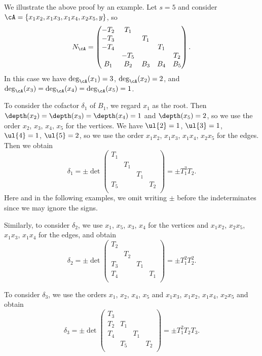 \begin{exam}
We illustrate the above proof by an example.
Let $s = 5$ and consider $\cA = \{x_1 x_2, x_1 x_3, x_1 x_4, x_2 x_5, y\}$, so
\[
N_{\cA}
= \begin{pmatrix}
	-T_2 & T_1 & & &\\
	-T_3 & & T_1 & &\\
	-T_4 & & & T_1 &\\
	& -T_5 & & & T_2\\
	B_1 & B_2 & B_3 & B_4 & B_5	
\end{pmatrix}.
\]
In this case we have $\deg_{\cA}(x_1) = 3$, $\deg_{\cA}(x_2) = 2$, and $\deg_{\cA}(x_3) = \deg_{\cA}(x_4) = \deg_{\cA}(x_5) = 1$.

To consider the cofactor $\delta_1$ of $B_1$, we regard $x_1$ as the root.
Then $\depth(x_2) = \depth(x_3) = \depth(x_4) = 1$ and $\depth(x_5) = 2$, so we use the order $x_2$, $x_3$, $x_4$, $x_5$ for the vertices.
We have $\ul{2} = 1$, $\ul{3} = 1$, $\ul{4} = 1$, $\ul{5} = 2$, so we use the order $x_1 x_2$, $x_1 x_3$, $x_1 x_4$, $x_2 x_5$ for the edges.
Then we obtain
\[
\delta_1 = \pm \det 
\begin{pmatrix}
	T_1 & & &\\
	& T_1 & &\\
	& & T_1 &\\
	T_5 & & & T_2\\
\end{pmatrix}
= \pm T_1^3 T_2.
\]
Here and in the following examples, we omit writing $\pm$ before the indeterminates since we may ignore the signs.

Similarly, to consider $\delta_2$, we use $x_1$, $x_5$, $x_3$, $x_4$ for the vertices and $x_1 x_2$, $x_2 x_5$, $x_1 x_3$, $x_1 x_4$ for the edges, and obtain
\[
\delta_2 = \pm \det 
\begin{pmatrix}
	T_2 & & &\\
	& T_2 & &\\
	T_3 & & T_1 &\\
	T_4 & & & T_1\\
\end{pmatrix}
= \pm T_1^2 T_2^2.
\]

To consider $\delta_3$, we use the orders $x_1$, $x_2$, $x_4$, $x_5$ and $x_1 x_3$, $x_1 x_2$, $x_1 x_4$, $x_2 x_5$ and obtain
\[
\delta_3 = \pm \det 
\begin{pmatrix}
	T_3 & & &\\
	T_2 & T_1 & &\\
	T_4 & & T_1 &\\
	& T_5 & & T_2\\
\end{pmatrix}
= \pm T_1^2 T_2 T_3.
\]
\end{exam}


